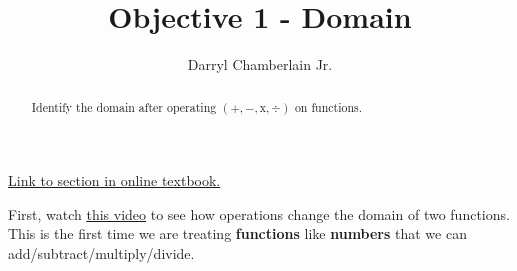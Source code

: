 \documentclass{ximera}
\author{Darryl Chamberlain Jr.}
\title{Objective 1 - Domain}
\begin{document}
\begin{abstract}
Identify the domain after operating $(+, -, \text{x}, \div)$ on functions.
\end{abstract}
\maketitle
 
\href{https://cnx.org/contents/mwjClAV_@8.1:ik_Ed0Pa@12/Composition-of-Functions}{Link to section in online textbook.}
 
 
First, watch
\underline{\href{https://mediasite.video.ufl.edu/Mediasite/Play/492b15b9c57c443d84b8f5bb37304a3d1d}{this video}} to see how operations change the domain of two functions. This is the first time we are treating \textbf{functions} like \textbf{numbers} that we can add/subtract/multiply/divide.
 
 
\end{document}
